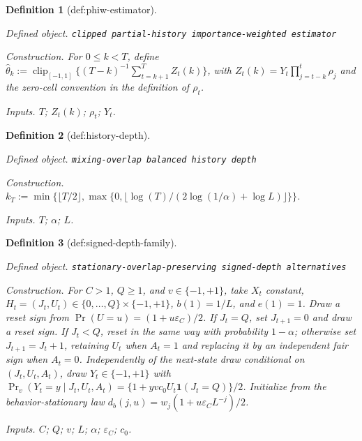 \documentclass{article}
\newtheorem{definition}{Definition}
\begin{document}
\begin{definition}[def:phiw-estimator]\label{def:phiw-estimator}
\par\smallskip\noindent\emph{Defined object.} \texttt{clipped partial-\allowbreak{}history importance-\allowbreak{}weighted estimator}
\par\smallskip\noindent\emph{Construction.} For \(0\le k<T\), define \(\widehat\theta_k:=\operatorname{clip}_{[-1,1]}\{(T-k)^{-1}\sum_{t=k+1}^{T}Z_t(k)\}\), with \(Z_t(k)=Y_t\prod_{j=t-k}^{t}\rho_j\) and the zero-cell convention in the definition of \(\rho_t\).
\par\smallskip\noindent\emph{Inputs.} \(T\); \(Z_t(k)\); \(\rho_t\); \(Y_t\).
\end{definition}

\begin{definition}[def:history-depth]\label{def:history-depth}
\par\smallskip\noindent\emph{Defined object.} \texttt{mixing-\allowbreak{}overlap balanced history depth}
\par\smallskip\noindent\emph{Construction.} \(k_T:=\min\{\lfloor T/2\rfloor,\max\{0,\lfloor\log(T)/(2\log(1/\alpha)+\log L)\rfloor\}\}\).
\par\smallskip\noindent\emph{Inputs.} \(T\); \(\alpha\); \(L\).
\end{definition}

\begin{definition}[def:signed-depth-family]\label{def:signed-depth-family}
\par\smallskip\noindent\emph{Defined object.} \texttt{stationary-\allowbreak{}overlap-\allowbreak{}preserving signed-\allowbreak{}depth alternatives}
\par\smallskip\noindent\emph{Construction.} For \(C>1\), \(Q\ge1\), and \(v\in\{-1,+1\}\), take \(X_t\) constant, \(H_t=(J_t,U_t)\in\{0,\ldots,Q\}\times\{-1,+1\}\), \(b(1)=1/L\), and \(e(1)=1\). Draw a reset sign from \(\Pr(U= u)=(1+u\varepsilon_C)/2\). If \(J_t=Q\), set \(J_{t+1}=0\) and draw a reset sign. If \(J_t<Q\), reset in the same way with probability \(1-\alpha\); otherwise set \(J_{t+1}=J_t+1\), retaining \(U_t\) when \(A_t=1\) and replacing it by an independent fair sign when \(A_t=0\). Independently of the next-state draw conditional on \((J_t,U_t,A_t)\), draw \(Y_t\in\{-1,+1\}\) with \(\Pr_v(Y_t=y\mid J_t,U_t,A_t)=\{1+yvc_0U_t\mathbf 1(J_t=Q)\}/2\). Initialize from the behavior-stationary law \(d_b(j,u)=w_j(1+u\varepsilon_C L^{-j})/2\).
\par\smallskip\noindent\emph{Inputs.} \(C\); \(Q\); \(v\); \(L\); \(\alpha\); \(\varepsilon_C\); \(c_0\).
\end{definition}
\end{document}
